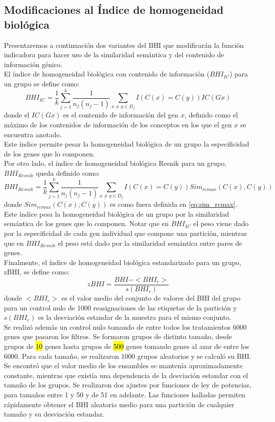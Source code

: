 \subsection{Modificaciones al Índice de homogeneidad biológica}
Presentaremos a continuación dos variantes del BHI que modificarán la función indicadora para hacer uso de la similaridad semántica y del contenido de información génico.\\
El índice de homogeneidad biológica con contenido de información ($BHI_{IC}$) para un grupo se define como:
\begin{equation}
	BHI_{IC} = \frac{1}{k}\sum\limits_{j=1}^k\frac{1}{n_j(n_j-1)}\sum\limits_{x\neq y\in D_j}I(C(x)=C(y))IC(Gx)
\end{equation}
donde el $IC(Gx)$ es el contenido de información del gen $x$, definido como el máximo de los contenidos de información de los conceptos en los que el gen $x$ se encuentra anotado.\\
Este índice permite pesar la homogeneidad biológica de un grupo la especificidad de los genes que lo componen.\\
Por otro lado, el índice de homogeneidad biológica Resnik para un grupo, $BHI_{Resnik}$ queda definido como:
\begin{equation}
	BHI_{Resnik} = \frac{1}{k}\sum\limits_{j=1}^k\frac{1}{n_j(n_j-1)}\sum\limits_{x\neq y\in D_j}I(C(x)=C(y))Sim_{rcmax}(C(x), C(y))
\end{equation}
donde $Sim_{rcmax}(C(x), C(y))$ es como fuera definida en \ref{eq:sim_rcmax}.\\
Este índice pesa la homogeneidad biológica de un grupo por la similaridad semántica de los genes que lo componen. Notar que en $BHI_{IC}$ el peso viene dado por la especificidad de cada gen individual que compone una partición, mientras que en $BHI_{Resnik}$ el peso está dado por la similaridad semántica entre pares de genes.\\
Finalmente, el índice de homogeneidad biológica estandarizado para un grupo, zBHI, se define como:
\begin{equation}
	zBHI = \frac{BHI-<BHI_r>}{s(BHI_r)}
\end{equation}
donde $<BHI_r>$ es el valor medio del conjunto de valores del BHI del grupo para un control nulo de 1000 reasignaciones de las etiquetas de la partición y $s(BHI_r)$ es la desviación estandar de la muestra para el mismo conjunto.\\
Se realizó además un control nulo tomando de entre todos los tratamientos 6000 genes que pasaron los filtros. Se formaron grupos de distinto tamaño, desde grupos de \hl{10} genes hasta grupos de \hl{500} genes tomando genes al azar de entre los 6000. Para cada tamaño, se realizaron 1000 grupos aleatorios y se calculó su BHI. Se encontró que el valor medio de los ensambles se mantenía aproximadamente constante, mientras que existía una dependencia de la desviación estandar con el tamaño de los grupos. Se realizaron dos ajustes por funciones de ley de potencias, para tamaños entre 1 y 50 y de 51 en adelante. Las funciones halladas permiten rápidamente obtener el BHI aleatorio medio para una partición de cualquier tamaño y su desviación estandar.
